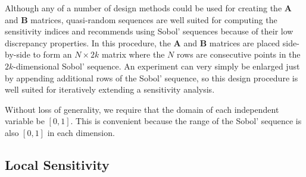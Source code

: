 \documentclass[12pt]{article}
\begin{document}
Although any of a number of design methods could be used for creating the $\mathbf{A}$ and $\mathbf{B}$ matrices, quasi-random sequences are well suited for computing the sensitivity indices and \citet{saltelli_variance_2010} recommends using Sobol' sequences because of their low discrepancy properties. In this procedure, the $\mathbf{A}$ and $\mathbf{B}$ matrices are placed side-by-side to form an $N \times 2 k$ matrix where the $N$ rows are consecutive points in the $2 k$-dimensional Sobol' sequence. An experiment can very simply be enlarged just by appending additional rows of the Sobol' sequence, so this design procedure is well suited for iteratively extending a sensitivity analysis.

Without loss of generality, we require that the domain of each independent variable be $[0, 1]$. This is convenient because the range of the Sobol' sequence is also $[0, 1]$ in each dimension.


\subsection{Local Sensitivity}
\label{sec:local}
\end{document}
